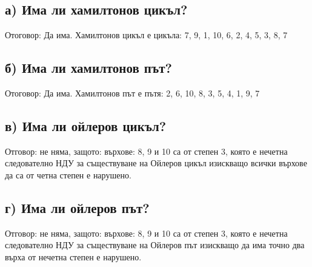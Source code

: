 \documentclass[14pt]{extarticle}
\begin{document}
\subsection*{а) Има ли хамилтонов цикъл?}
Отоговор: Да има. Хамилтонов цикъл е цикъла: 7, 9, 1, 10, 6, 2, 4, 5, 3, 8, 7
\subsection*{б) Има ли хамилтонов път?}
Отоговор: Да има. Хамилтонов път е пътя: 2, 6, 10, 8, 3, 5, 4, 1, 9, 7
\subsection*{в)  Има ли ойлеров цикъл? }
Отговор: не няма, защото: върхове: 8, 9 и 10 са от степен 3, която е нечетна следователно НДУ за съществуване на Ойлеров цикъл изискващо всички върхове да са от четна степен е нарушено.
\subsection*{г)  Има ли ойлеров път? }
Отговор: не няма, защото: върхове: 8, 9 и 10 са от степен 3, която е нечетна следователно НДУ за съществуване на Ойлеров път изискващо да има точно два върха от нечетна степен е нарушено.
\end{document}
